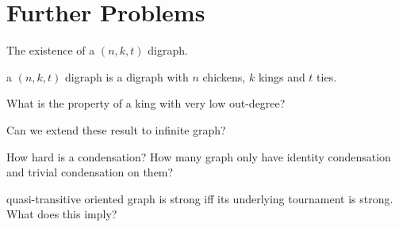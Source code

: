 \chapter{Further Problems}

The existence of a \((n, k, t)\) digraph.
\begin{definition}
  a \((n, k, t)\) digraph is a digraph with \(n\) chickens, \(k\) kings and \(t\) ties.
\end{definition}


What is the property of a king with very low out-degree?

Can we extend these result to infinite graph?

How hard is a condensation?
How many graph only have identity condensation
and trivial condensation on them?

quasi-transitive oriented graph is strong
iff its underlying tournament is strong.
What does this imply?
~\cite{bang-jensen_kings_1998}
~\cite{bangjensen_quasitransitive_1995}
